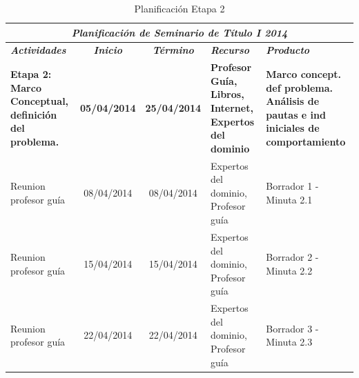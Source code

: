 \documentclass[12pt,letterpaper]{article}
\begin{document}
\begin{table}[htf]
\begin{tabular}{| p{4cm} | c | c | p{3cm}  | p{2.5cm} |}
\hline

\multicolumn{5}{|c|}{\textbf{\textit{Planificaci\'on de Seminario de T\'itulo I 2014}}} \\ \hline \hline
\textit{\textbf{Actividades}} & 
\textit{\textbf{Inicio}} & 
\textit{\textbf{T\'ermino}} & 
\centering \textit{\textbf{Recurso}} & 
\textit{\textbf{Producto}} \\ \hline \hline
\textbf{Etapa 2: Marco Conceptual, definici\'on del problema.} & 
\textbf{05/04/2014} & 
\textbf{25/04/2014} & 
\textbf{Profesor Gu\'ia, Libros, Internet, Expertos del dominio} & 
\textbf{Marco concept. def problema. An\'alisis de pautas e ind iniciales de comportamiento} \\ \hline


Reunion profesor gu\'ia & 
08/04/2014 & 
08/04/2014 &  
Expertos del dominio, Profesor gu\'ia & 
Borrador 1 - Minuta 2.1\\ \hline

Reunion profesor gu\'ia & 
15/04/2014 & 
15/04/2014 &  
Expertos del dominio, Profesor gu\'ia & 
Borrador 2 - Minuta 2.2 \\ \hline

Reunion profesor gu\'ia & 
22/04/2014 & 
22/04/2014 &  
Expertos del dominio, Profesor gu\'ia & 
Borrador 3 - Minuta 2.3\\ \hline


\hline
\end{tabular}
\caption{Planificaci\'on Etapa 2}
\end{table}



\newpage
\clearpage


\end{document}
